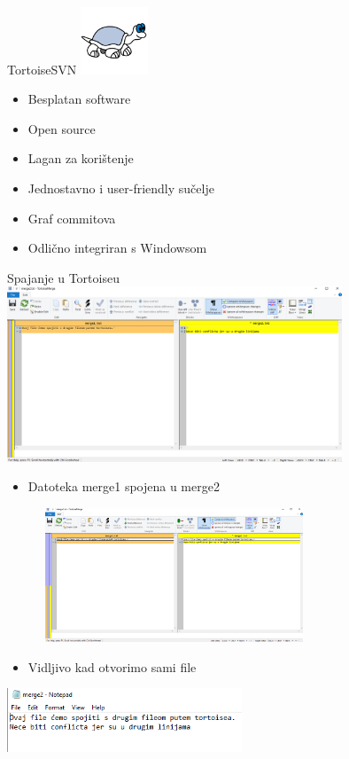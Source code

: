 \begin{frame}{TortoiseSVN}
\includegraphics[width=2cm, height=2cm]{tortoise4.png}
\begin{itemize}
    \item Besplatan software
    \item Open source
    \item Lagan za korištenje
    \item Jednostavno i user-friendly sučelje
    \item Graf commitova
    \item Odlično integriran s Windowsom
    
    
\end{itemize}
    
\end{frame}
\begin{frame}{Spajanje u Tortoiseu}
\includegraphics[width=10cm]{tortoise1.png}
\end{frame}
\begin{frame}
\begin{itemize}
    \item\small{Datoteka merge1 spojena u merge2}
\end{itemize}
\includegraphics[height=4cm, width=10cm]{tortoise2.png}\newline
\begin{itemize}
    \item\small{Vidljivo kad otvorimo sami file}
\end{itemize}
\includegraphics[width=7cm]{tortoise3.png}
\end{frame}

